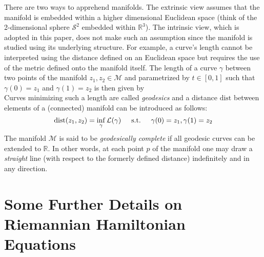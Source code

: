 \documentclass[10pt,journal,compsoc]{IEEEtran}
\begin{document}
There are two ways to apprehend manifolds. The extrinsic view assumes that the manifold is embedded within a higher dimensional Euclidean space (think of the 2-dimensional sphere $\mathcal{S}^2$ embedded within $\mathbb{R}^3$). The intrinsic view, which is adopted in this paper, does not make such an assumption since the manifold is studied using its underlying structure. For example, a curve's length cannot be interpreted using the distance defined on an Euclidean space but requires the use of the metric defined onto the manifold itself. The length of a curve $\gamma$ between two points of the manifold $z_1, z_2 \in \mathcal{M}$ and parametrized by $ t \in [0, 1]$ such that $\gamma(0) = z_1$ and $\gamma(1) = z_2$ is then given by 
\[
\]  
Curves minimizing such a length are called \textit{geodesics} and a distance $\mathrm{dist}$ between elements of a (connected) manifold can be introduced as follows:
\begin{equation}\label{Eq: app geodesic distance}
    \mathrm{dist}(z_1, z_2) = \inf_{\gamma} \mathcal{L}(\gamma) \hspace{5mm} \mathrm{s.t.} \hspace{5mm} \gamma(0) = z_1, \gamma(1) = z_2
\end{equation}
The manifold $\mathcal{M}$ is said to be \textit{geodesically complete} if all geodesic curves can be extended to $\mathbb{R}$. In other words, at each point $p$ of the manifold one may draw a \emph{straight} line (with respect to the formerly defined distance) indefinitely and in any direction. 


\section{Some Further Details on Riemannian Hamiltonian Equations}\label{appendix B}
\end{document}
